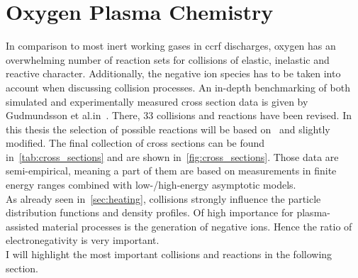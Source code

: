 %
	\section{Oxygen Plasma Chemistry}\label{sec:negionphysics}
%
		In comparison to most inert working gases in ccrf discharges, oxygen has an overwhelming number of reaction sets for collisions of elastic, inelastic and reactive character. Additionally, the negative ion species has to be taken into account when discussing collision processes. An in-depth benchmarking of both simulated and experimentally measured cross section data is given by Gudmundsson et al.\@ in~\cite{Gudmundsson13}. There, 33 collisions and reactions have been revised. In this thesis the selection of possible reactions will be based on~\cite{Bronold07b} and slightly modified. The final collection of cross sections can be found in~\autoref{tab:cross_sections} and are shown  in~\autoref{fig:cross_sections}. Those data are semi-empirical, meaning a part of them are based on measurements in finite energy ranges combined with low-/high-energy asymptotic models.\\
		As already seen in~\autoref{sec:heating}, collisions strongly influence the particle distribution functions and density profiles. Of high importance for plasma-assisted material processes is the generation of negative ions. Hence the ratio of electronegativity is very important.\\
		I will highlight the most important collisions and reactions in the following section. 
%
